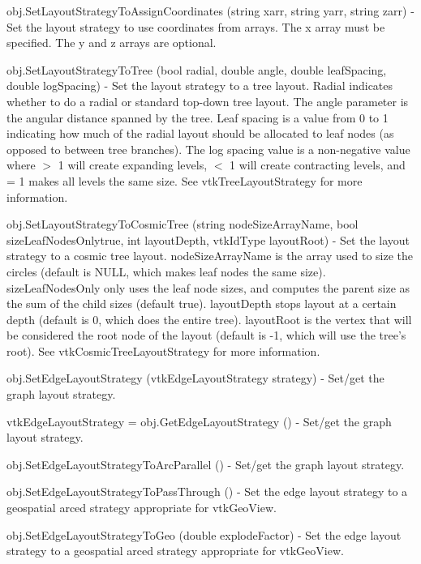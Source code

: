 \begin{DoxyItemize}
\item {\ttfamily obj.\-Set\-Layout\-Strategy\-To\-Assign\-Coordinates (string xarr, string yarr, string zarr)} -\/ Set the layout strategy to use coordinates from arrays. The x array must be specified. The y and z arrays are optional.  
\item {\ttfamily obj.\-Set\-Layout\-Strategy\-To\-Tree (bool radial, double angle, double leaf\-Spacing, double log\-Spacing)} -\/ Set the layout strategy to a tree layout. Radial indicates whether to do a radial or standard top-\/down tree layout. The angle parameter is the angular distance spanned by the tree. Leaf spacing is a value from 0 to 1 indicating how much of the radial layout should be allocated to leaf nodes (as opposed to between tree branches). The log spacing value is a non-\/negative value where $>$ 1 will create expanding levels, $<$ 1 will create contracting levels, and = 1 makes all levels the same size. See vtk\-Tree\-Layout\-Strategy for more information.  
\item {\ttfamily obj.\-Set\-Layout\-Strategy\-To\-Cosmic\-Tree (string node\-Size\-Array\-Name, bool size\-Leaf\-Nodes\-Onlytrue, int layout\-Depth, vtk\-Id\-Type layout\-Root)} -\/ Set the layout strategy to a cosmic tree layout. node\-Size\-Array\-Name is the array used to size the circles (default is N\-U\-L\-L, which makes leaf nodes the same size). size\-Leaf\-Nodes\-Only only uses the leaf node sizes, and computes the parent size as the sum of the child sizes (default true). layout\-Depth stops layout at a certain depth (default is 0, which does the entire tree). layout\-Root is the vertex that will be considered the root node of the layout (default is -\/1, which will use the tree's root). See vtk\-Cosmic\-Tree\-Layout\-Strategy for more information.  
\item {\ttfamily obj.\-Set\-Edge\-Layout\-Strategy (vtk\-Edge\-Layout\-Strategy strategy)} -\/ Set/get the graph layout strategy.  
\item {\ttfamily vtk\-Edge\-Layout\-Strategy = obj.\-Get\-Edge\-Layout\-Strategy ()} -\/ Set/get the graph layout strategy.  
\item {\ttfamily obj.\-Set\-Edge\-Layout\-Strategy\-To\-Arc\-Parallel ()} -\/ Set/get the graph layout strategy.  
\item {\ttfamily obj.\-Set\-Edge\-Layout\-Strategy\-To\-Pass\-Through ()} -\/ Set the edge layout strategy to a geospatial arced strategy appropriate for vtk\-Geo\-View.  
\item {\ttfamily obj.\-Set\-Edge\-Layout\-Strategy\-To\-Geo (double explode\-Factor)} -\/ Set the edge layout strategy to a geospatial arced strategy appropriate for vtk\-Geo\-View.  

\end{DoxyItemize}
